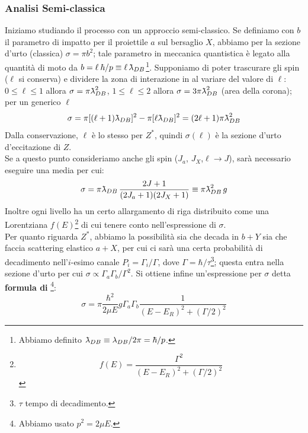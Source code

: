\subsubsection{Analisi Semi-classica}
Iniziamo studiando il processo con un approccio semi-classico. Se definiamo con $b$ il parametro di impatto per il proiettile $a$ sul bersaglio $X$, abbiamo per la sezione d'urto (classica) $\sigma = \pi b^2$; tale parametro in meccanica quantistica è legato alla quantità di moto da $b = \ell \: \hbar/p\equiv \ell\,\lambdabar_{DB}$\footnote{Abbiamo definito $\lambdabar_{DB}\equiv \lambda_{DB}/2\pi = \hbar/p$.}. Supponiamo di poter trascurare gli spin ($\ell$ si conserva) e dividere la zona di interazione in  al variare del valore di $\ell$: $0\leq \ell \leq 1$ allora $\sigma = \pi\lambdabar^2_{DB}$, $1\leq \ell \leq 2$ allora $\sigma = 3\pi\lambdabar^2_{DB}$ (area della corona); per un generico $\ell$
$$\sigma = \pi [(\ell+1)\lambdabar_{DB}]^2 - \pi[\ell\lambdabar_{DB}]^2 = (2\ell +1) \pi\lambdabar^2_{DB}$$
Dalla conservazione, $\ell$ è lo stesso per $Z^*$, quindi $\sigma(\ell)$ è la sezione d'urto d'eccitazione di $Z$.\\
Se a questo punto consideriamo anche gli spin ($J_a$, $J_X$,$\ell\to J$), sarà necessario eseguire una media per cui:
$$\sigma = \pi\lambdabar_{DB}\,\frac{2J+1}{(2J_a+1)(2J_X+1)}\equiv \pi\lambdabar_{DB}^2\,g$$
Inoltre ogni livello ha un certo allargamento di riga distribuito come una Lorentziana $f(E)$\footnote{$$f(E)=\frac{\Gamma^2}{(E-E_R)^2+(\Gamma/2)^2}$$} di cui tenere conto nell'espressione di $\sigma$.\\
Per quanto riguarda $Z^*$, abbiamo la possibilità sia che decada in $b+Y$ sia che faccia scattering elastico $a+X$, per cui ci sarà una certa probabilità di decadimento nell'$i$-esimo canale $P_i = \Gamma_i/\Gamma$, dove $\Gamma=\hbar/\tau$\footnote{$\tau$ tempo di decadimento.}; questa entra nella sezione d'urto per cui $\sigma\propto \Gamma_a\Gamma_b/\Gamma^2$. Si ottiene infine un'espressione per $\sigma$ detta \textbf{formula di \BW}\footnote{Abbiamo usato $p^2 = 2\mu E$.}:
$$\sigma = \pi\frac{\hbar^2}{2\mu E}g\Gamma_a\Gamma_b \frac{1}{(E-E_R)^2+(\Gamma/2)^2}$$

